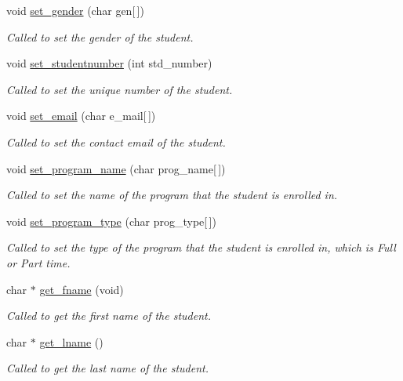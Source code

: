 \begin{DoxyCompactItemize}
void \hyperlink{classstudent_a9a7dee8d26c641ba1fa470f5d00cb4c0}{set\-\_\-gender} (char gen\mbox{[}$\,$\mbox{]})
\begin{DoxyCompactList}\small\item\em Called to set the gender of the student. \end{DoxyCompactList}\item 
void \hyperlink{classstudent_a13fc8fab0a406d28a5a47e38b508e2da}{set\-\_\-studentnumber} (int std\-\_\-number)
\begin{DoxyCompactList}\small\item\em Called to set the unique number of the student. \end{DoxyCompactList}\item 
void \hyperlink{classstudent_a4f99f4b73053a02f58a66ae984f76422}{set\-\_\-email} (char e\-\_\-mail\mbox{[}$\,$\mbox{]})
\begin{DoxyCompactList}\small\item\em Called to set the contact email of the student. \end{DoxyCompactList}\item 
void \hyperlink{classstudent_acdc094ec51b1363b1b88475fc685a326}{set\-\_\-program\-\_\-name} (char prog\-\_\-name\mbox{[}$\,$\mbox{]})
\begin{DoxyCompactList}\small\item\em Called to set the name of the program that the student is enrolled in. \end{DoxyCompactList}\item 
void \hyperlink{classstudent_a58b76ac2651c988b5e2f6806fa4611b3}{set\-\_\-program\-\_\-type} (char prog\-\_\-type\mbox{[}$\,$\mbox{]})
\begin{DoxyCompactList}\small\item\em Called to set the type of the program that the student is enrolled in, which is Full or Part time. \end{DoxyCompactList}\item 
char $\ast$ \hyperlink{classstudent_afc9772fd9e2b90b034c918475049b8f0}{get\-\_\-fname} (void)
\begin{DoxyCompactList}\small\item\em Called to get the first name of the student. \end{DoxyCompactList}\item 
char $\ast$ \hyperlink{classstudent_a7e3b30c52554617ccae85a7f40338b50}{get\-\_\-lname} ()
\begin{DoxyCompactList}\small\item\em Called to get the last name of the student. \end{DoxyCompactList}\item 

\end{DoxyCompactItemize}
